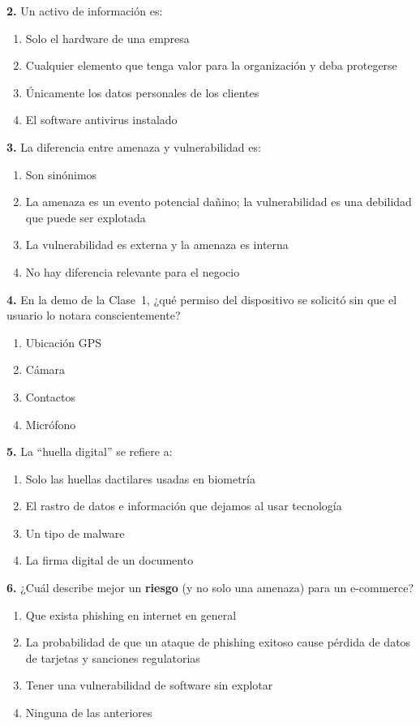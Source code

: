 \documentclass[12pt,a4paper]{article}
\begin{document}
\textbf{2.} Un activo de información es:
\begin{enumerate}[label=\alph*), leftmargin=2.5em]
  \item Solo el hardware de una empresa
  \item Cualquier elemento que tenga valor para la organización y deba protegerse
  \item Únicamente los datos personales de los clientes
  \item El software antivirus instalado
\end{enumerate}

\textbf{3.} La diferencia entre amenaza y vulnerabilidad es:
\begin{enumerate}[label=\alph*), leftmargin=2.5em]
  \item Son sinónimos
  \item La amenaza es un evento potencial dañino; la vulnerabilidad es una debilidad que puede ser explotada
  \item La vulnerabilidad es externa y la amenaza es interna
  \item No hay diferencia relevante para el negocio
\end{enumerate}

\textbf{4.} En la demo de la Clase~1, ¿qué permiso del dispositivo se solicitó
sin que el usuario lo notara conscientemente?
\begin{enumerate}[label=\alph*), leftmargin=2.5em]
  \item Ubicación GPS
  \item Cámara
  \item Contactos
  \item Micrófono
\end{enumerate}

\textbf{5.} La ``huella digital'' se refiere a:
\begin{enumerate}[label=\alph*), leftmargin=2.5em]
  \item Solo las huellas dactilares usadas en biometría
  \item El rastro de datos e información que dejamos al usar tecnología
  \item Un tipo de malware
  \item La firma digital de un documento
\end{enumerate}

\textbf{6.} ¿Cuál describe mejor un \textbf{riesgo} (y no solo una amenaza)
para un e-commerce?
\begin{enumerate}[label=\alph*), leftmargin=2.5em]
  \item Que exista phishing en internet en general
  \item La probabilidad de que un ataque de phishing exitoso cause pérdida de datos de tarjetas y sanciones regulatorias
  \item Tener una vulnerabilidad de software sin explotar
  \item Ninguna de las anteriores
\end{enumerate}
\end{document}
